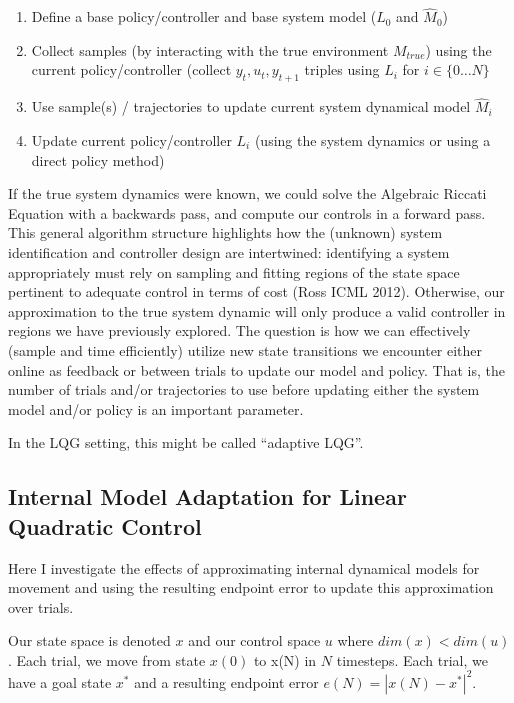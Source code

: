\documentclass[
  a4paper,
]{article}
\providecommand{\tightlist}{%
  \setlength{\itemsep}{0pt}\setlength{\parskip}{0pt}}
\begin{document}
\begin{enumerate}
\def\labelenumi{\arabic{enumi}.}
\setcounter{enumi}{-1}
\tightlist
\item
  Define a base policy/controller and base system model (\(L_0\) and
  \(\hat{M}_0\))
\item
  Collect samples (by interacting with the true environment
  \(M_{true}\)) using the current policy/controller (collect
  \(y_t,u_t,y_{t+1}\) triples using \(L_i\) for \(i \in \{0\dots N\}\)
\item
  Use sample(s) / trajectories to update current system dynamical model
  \(\hat{M}_i\)
\item
  Update current policy/controller \(L_i\) (using the system dynamics or
  using a direct policy method)
\end{enumerate}

If the true system dynamics were known, we could solve the Algebraic
Riccati Equation with a backwards pass, and compute our controls in a
forward pass. This general algorithm structure highlights how the
(unknown) system identification and controller design are intertwined:
identifying a system appropriately must rely on sampling and fitting
regions of the state space pertinent to adequate control in terms of
cost (Ross ICML 2012). Otherwise, our approximation to the true system
dynamic will only produce a valid controller in regions we have
previously explored. The question is how we can effectively (sample and
time efficiently) utilize new state transitions we encounter either
online as feedback or between trials to update our model and policy.
That is, the number of trials and/or trajectories to use before updating
either the system model and/or policy is an important parameter.

In the LQG setting, this might be called ``adaptive LQG''.

\hypertarget{internal-model-adaptation-for-linear-quadratic-control}{%
\subsection{Internal Model Adaptation for Linear Quadratic
Control}\label{internal-model-adaptation-for-linear-quadratic-control}}

Here I investigate the effects of approximating internal dynamical
models for movement and using the resulting endpoint error to update
this approximation over trials.

Our state space is denoted \(x\) and our control space \(u\) where
\(dim(x) < dim(u)\). Each trial, we move from state \(x(0)\) to x(N) in
\(N\) timesteps. Each trial, we have a goal state \(x^*\) and a
resulting endpoint error \(e(N) = |x(N) - x^*|^2\).
\end{document}
